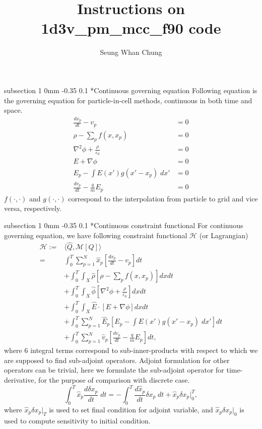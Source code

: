 \documentclass[11pt]{article}
\title{Instructions on 1d3v\_pm\_mcc\_f90 code}
\author{Seung Whan Chung}
\makeatletter
\renewcommand{\subsection}{\@startsection
{subsection}%
{1}%
{0mm}%
{-0.35\baselineskip}%
{0.1\baselineskip}%
{\normalfont\large\bfseries\color{brown}}}%
\def\Dnorm#1#2{ \frac{d #1 }{ d #2} }
\newcommand{\vp}{v_p}
\newcommand{\xp}{x_p}
\newcommand{\vph}{\hat{v}_p}
\newcommand{\xph}{\hat{x}_p}
\newcommand{\Eh}{\hat{E}}
\newcommand{\phih}{\hat{\phi}}
\newcommand{\rhoh}{\hat{\rho}}
\newcommand{\cH}{\mathcal{H}}
\makeatother
\begin{document}
\maketitle
\tableofcontents
\clearpage

\subsection*{Continuous governing equation}
Following equation is the governing equation for particle-in-cell methods,
continuous in both time and space.
\begin{equation*}
\begin{split}
\Dnorm{\xp}{t} - \vp &= 0\\
\rho - \sum_p f(x,\xp) &= 0\\
\nabla^2\phi + \frac{\rho}{\varepsilon_0} &= 0\\
E + \nabla\phi &= 0\\
E_p - \int E(x')g(x'-\xp)\;dx' &= 0\\
\Dnorm{\vp}{t} - \frac{q}{m}E_p &= 0
\end{split}
\end{equation*}
$f(\cdot,\cdot)$ and $g(\cdot,\cdot)$ correspond to the interpolation from particle to grid and vice versa, respectively.

\subsection*{Continuous constraint functional}
For continuous governing equation, we have following constraint functional $\cH$ (or Lagrangian)
\begin{equation*}
\begin{split}
\cH :=& \langle \hat{Q}, \mathcal{M}[Q] \rangle\\
=& \int_0^T\sum_{p=1}^{N} \xph\left[ \Dnorm{\xp}{t} - \vp \right]dt\\
&+ \int_0^T\int_X \rhoh\left[ \rho - \sum_p f(x,\xp) \right]dxdt\\
&+ \int_0^T\int_X \phih\left[ \nabla^2\phi + \frac{\rho}{\varepsilon_0} \right]dxdt\\
&+ \int_0^T\int_X \Eh\cdot\left[ E + \nabla\phi \right]dxdt\\
&+ \int_0^T\sum_{p=1}^{N} \Eh_p\left[ E_p - \int E(x')g(x'-\xp)\;dx' \right]dt\\
&+ \int_0^T\sum_{p=1}^{N} \vph\left[ \Dnorm{\vp}{t} - \frac{q}{m}E_p \right]dt,
\end{split}
\end{equation*}
where 6 integral terms correspond to sub-inner-products with respect to which we are supposed to find sub-adjoint operators.
Adjoint formulation for other operators can be trivial, here we formulate the sub-adjoint operator for time-derivative,
for the purpose of comparison with discrete case.
\begin{equation*}
\int_0^T \xph\Dnorm{\delta\xp}{t}\;dt = - \int_0^T \Dnorm{\xph}{t}\delta\xp\;dt + \xph\delta\xp\bigg|_0^T,
\end{equation*}
where $\xph\delta\xp\bigg|_T$ is used to set final condition for adjoint variable,
and $\xph\delta\xp\bigg|_0$ is used to compute sensitivity to initial condition.
\end{document}
